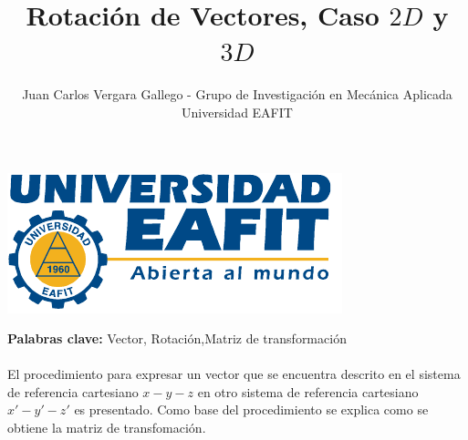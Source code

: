 \documentclass[12pt,letterpaper]{article}
\author{Juan Carlos Vergara Gallego - Grupo de Investigación en Mecánica Aplicada \\ Universidad EAFIT}
\title{\textbf{Rotación de Vectores, Caso $2D$ y $3D$}}
\begin{document}
\pagestyle{fancyplain}
\fancyhf{}
\headheight=20pt %
\renewcommand{\headrulewidth}{0pt} %

\lhead %
{
\begin{minipage}{3cm}
\includegraphics[width=1.5 in]{img/logo.pdf}
\end{minipage}
}

\fancyfoot[c]{\thepage}

\maketitle


{\bf Palabras clave:} Vector, Rotación,Matriz de transformación\\\\

\abstract
%
El procedimiento para expresar un vector que se encuentra descrito en el sistema de referencia cartesiano $x-y-z$ en otro sistema de referencia cartesiano $x'-y'-z'$ es presentado. Como base del procedimiento se explica como se obtiene la matriz de transfomación. 
%
%
\end{document}
